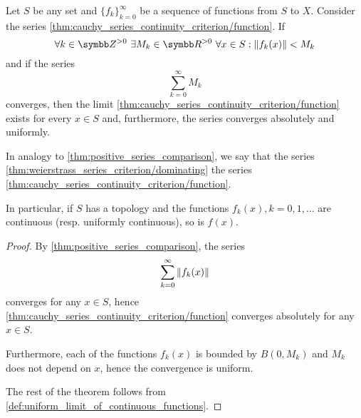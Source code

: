 \begin{corollary}\label{thm:weierstrass_series_criterion}\cite[]{Фихтенгольц1968/2}
  Let \( S \) be any set and \( \{ f_k \}_{k=0}^\infty \) be a sequence of functions from \( S \) to \( X \). Consider the series \cref{thm:cauchy_series_continuity_criterion/function}. If
  \begin{equation*}
    \forall k \in \Z^{>0} \ \exists M_k \in \R^{>0} \ \forall x \in S : \Norm{f_k(x)} < M_k
  \end{equation*}
  and if the series
  \begin{equation}\label{thm:weierstrass_series_criterion/dominating}
    \sum_{k=0}^\infty M_k
  \end{equation}
  converges, then the limit \cref{thm:cauchy_series_continuity_criterion/function} exists for every \( x \in S \) and, furthermore, the series converges absolutely and uniformly.

  In analogy to \cref{thm:positive_series_comparison}, we say that the series \cref{thm:weierstrass_series_criterion/dominating}  the series \cref{thm:cauchy_series_continuity_criterion/function}.

  In particular, if \( S \) has a topology and the functions \( f_k(x), k = 0, 1, \ldots \) are continuous (resp. uniformly continuous), so is \( f(x) \).
\end{corollary}
\begin{proof}
  By \cref{thm:positive_series_comparison}, the series
  \begin{equation*}
    \sum_{k=0}^\infty \left\Vert f_k(x) \right\Vert
  \end{equation*}
  converges for any \( x \in S \), hence \cref{thm:cauchy_series_continuity_criterion/function} converges absolutely for any \( x \in S \).

  Furthermore, each of the functions \( f_k(x) \) is bounded by \( B(0, M_k) \) and \( M_k \) does not depend on \( x \), hence the convergence is uniform.

  The rest of the theorem follows from \cref{def:uniform_limit_of_continuous_functions}.
\end{proof}

